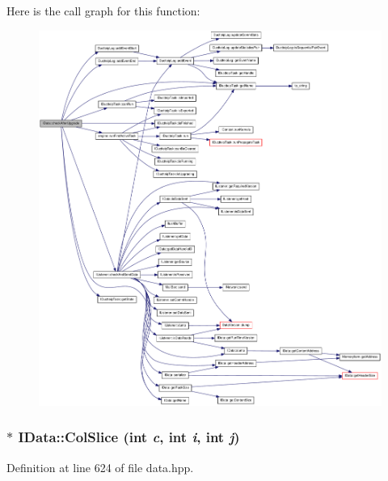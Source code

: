 Here is the call graph for this function:\nopagebreak
\begin{figure}[H]
\begin{center}
\leavevmode
\includegraphics[width=420pt]{class_i_data_a24f0723eb905accf62461f50a4487b33_cgraph}
\end{center}
\end{figure}
\hypertarget{class_i_data_a649b1ad6a0cfff3c7e2e89557375ea11}{
\subsubsection[{ColSlice}]{$\ast$ IData::ColSlice (int {\em c}, \/  int {\em i}, \/  int {\em j})}}
\label{class_i_data_a649b1ad6a0cfff3c7e2e89557375ea11}


Definition at line 624 of file data.hpp.

